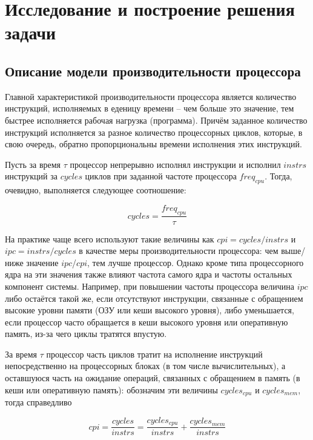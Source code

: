 \section{Исследование и построение решения задачи}
\label{sec:Section3} 

\subsection{Описание модели производительности процессора}

    Главной характеристикой производительности процессора является количество инструкций,
    исполняемых в еденицу времени -- чем больше это значение, тем быстрее исполняется рабочая
    нагрузка (программа). Причём заданное количество инструкций исполняется за разное количество
    процессорных циклов, которые, в свою очередь, обратно пропорциональны времени исполнения
    этих инструкций.

    Пусть за время $\tau$ процессор непрерывно исполнял инструкции и исполнил $instrs$ инструкций
    за $cycles$ циклов при заданной частоте процессора $freq_{cpu}$.
    Тогда, очевидно, выполняется следующее соотношение:

    \begin{equation} \label{cycles_base}
        cycles = \frac{freq_{cpu}}{\tau}
    \end{equation}

    На практике чаще всего используют такие величины как $cpi = cycles / instrs$ и
    $ipc = instrs / cycles$ в качестве меры производительности процессора: чем выше/ниже значение
    $ipc$/$cpi$, тем лучше процессор. Однако кроме типа процессорного ядра на эти значения также
    влияют частота самого ядра и частоты остальных компонент системы. Например, при повышении частоты
    процессора величина $ipc$ либо остаётся такой же, если отсутствуют инструкции, связанные с
    обращением высокие уровни памяти (ОЗУ или кеши высокого уровня), либо уменьшается, если
    процессор часто обращается в кеши высокого уровня или оперативную память, из-за чего циклы тратятся
    впустую.

    За время $\tau$ процессор часть циклов тратит на исполнение инструкций непосредственно на
    процессорных блоках (в том числе вычислительных), а оставшуюся часть на ожидание операций,
    связанных с обращением в память (в кеши или оперативную память): обозначим эти величины
    $cycles_{cpu}$ и $cycles_{mem}$, тогда справедливо

    \begin{equation}
        cpi = \frac{cycles}{instrs} = \frac{cycles_{cpu}}{instrs} + \frac{cycles_{mem}}{instrs}
    \end{equation}

